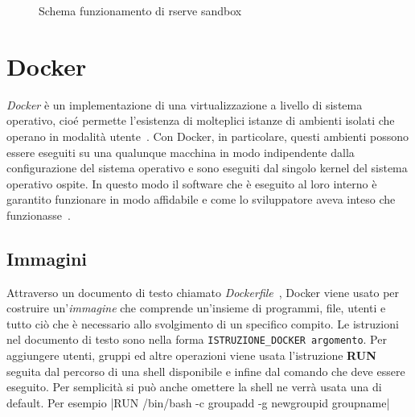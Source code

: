 \documentclass[10pt,titlepage,twoside,a4paper]{report}
\newenvironment{code}{\singlespacing\captionsetup{type=listing}}{}
\begin{document}
\begin{figure}[H]
\centering
\caption{Schema funzionamento di rserve sandbox}
\label{fig:rserveSandboxScheme}
\end{figure}

\begin{minipage}{\textwidth}
\centering
\begin{code}
    \caption{File di configurazione di Rserve}
    \label{lst:rservconf}
\end{code}
\end{minipage}


    \section{Docker}
\emph{Docker} è un implementazione di una virtualizzazione a 
livello di sistema operativo, cioé permette l'esistenza di molteplici istanze 
di ambienti isolati che operano in modalità 
utente~\cite{operatingSystemLevelVirtualization}. Con Docker, in particolare, 
questi ambienti possono essere eseguiti su una qualunque macchina in modo 
indipendente dalla configurazione del sistema operativo e sono eseguiti dal 
singolo kernel del sistema operativo ospite. In questo modo il software che è 
eseguito al loro interno è garantito funzionare in modo affidabile e come lo 
sviluppatore aveva inteso che funzionasse~\cite{docker}.

        \subsection{Immagini}
Attraverso un documento di testo chiamato 
\emph{Dockerfile}~\cite{DockerfileReference}, Docker viene 
usato per costruire un'\emph{immagine} che comprende un'insieme di 
programmi, file, utenti e tutto ciò che è necessario allo svolgimento di
un specifico compito. Le istruzioni nel documento di testo sono nella forma
\texttt{ISTRUZIONE_DOCKER argomento}. Per aggiungere utenti, 
gruppi ed altre operazioni viene usata l'istruzione \textbf{RUN} seguita dal 
percorso di una shell disponibile e infine dal comando che deve essere eseguito. Per 
semplicità si può anche omettere la shell ne verrà usata una di default. Per 
esempio
|RUN /bin/bash -c groupadd -g newgroupid groupname|
\end{document}
